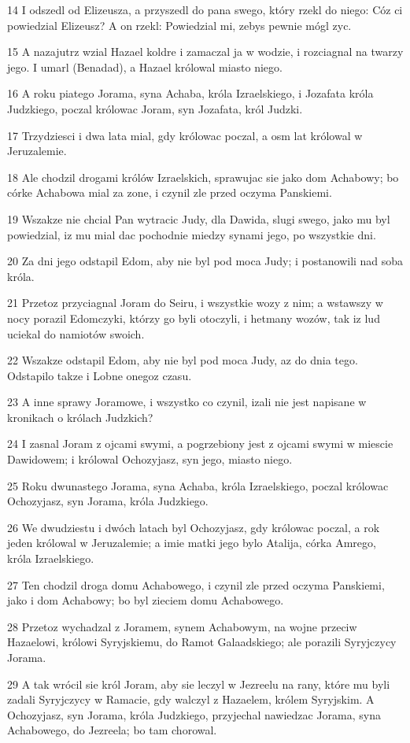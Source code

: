 \par 14 I odszedl od Elizeusza, a przyszedl do pana swego, który rzekl do niego: Cóz ci powiedzial Elizeusz? A on rzekl: Powiedzial mi, zebys pewnie mógl zyc.
\par 15 A nazajutrz wzial Hazael koldre i zamaczal ja w wodzie, i rozciagnal na twarzy jego. I umarl (Benadad), a Hazael królowal miasto niego.
\par 16 A roku piatego Jorama, syna Achaba, króla Izraelskiego, i Jozafata króla Judzkiego, poczal królowac Joram, syn Jozafata, król Judzki.
\par 17 Trzydziesci i dwa lata mial, gdy królowac poczal, a osm lat królowal w Jeruzalemie.
\par 18 Ale chodzil drogami królów Izraelskich, sprawujac sie jako dom Achabowy; bo córke Achabowa mial za zone, i czynil zle przed oczyma Panskiemi.
\par 19 Wszakze nie chcial Pan wytracic Judy, dla Dawida, slugi swego, jako mu byl powiedzial, iz mu mial dac pochodnie miedzy synami jego, po wszystkie dni.
\par 20 Za dni jego odstapil Edom, aby nie byl pod moca Judy; i postanowili nad soba króla.
\par 21 Przetoz przyciagnal Joram do Seiru, i wszystkie wozy z nim; a wstawszy w nocy porazil Edomczyki, którzy go byli otoczyli, i hetmany wozów, tak iz lud uciekal do namiotów swoich.
\par 22 Wszakze odstapil Edom, aby nie byl pod moca Judy, az do dnia tego. Odstapilo takze i Lobne onegoz czasu.
\par 23 A inne sprawy Joramowe, i wszystko co czynil, izali nie jest napisane w kronikach o królach Judzkich?
\par 24 I zasnal Joram z ojcami swymi, a pogrzebiony jest z ojcami swymi w miescie Dawidowem; i królowal Ochozyjasz, syn jego, miasto niego.
\par 25 Roku dwunastego Jorama, syna Achaba, króla Izraelskiego, poczal królowac Ochozyjasz, syn Jorama, króla Judzkiego.
\par 26 We dwudziestu i dwóch latach byl Ochozyjasz, gdy królowac poczal, a rok jeden królowal w Jeruzalemie; a imie matki jego bylo Atalija, córka Amrego, króla Izraelskiego.
\par 27 Ten chodzil droga domu Achabowego, i czynil zle przed oczyma Panskiemi, jako i dom Achabowy; bo byl zieciem domu Achabowego.
\par 28 Przetoz wychadzal z Joramem, synem Achabowym, na wojne przeciw Hazaelowi, królowi Syryjskiemu, do Ramot Galaadskiego; ale porazili Syryjczycy Jorama.
\par 29 A tak wrócil sie król Joram, aby sie leczyl w Jezreelu na rany, które mu byli zadali Syryjczycy w Ramacie, gdy walczyl z Hazaelem, królem Syryjskim. A Ochozyjasz, syn Jorama, króla Judzkiego, przyjechal nawiedzac Jorama, syna Achabowego, do Jezreela; bo tam chorowal.


